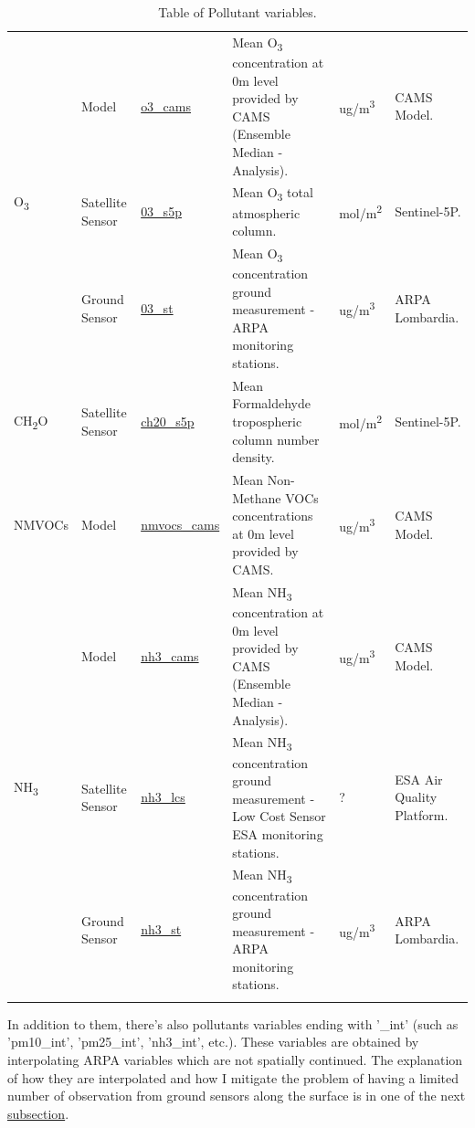 \begin{center}
\begin{longtable}{ |p{2cm}|p{1.5cm}|p{2.3cm}|p{4cm}|p{1cm}|p{2cm}| }
\multirow{3}{4em}{O\textsubscript{3}} & Model  & \underline{o3\_cams} & Mean O\textsubscript{3} concentration at 0m level provided by CAMS  (Ensemble Median - Analysis).\par & ug/m\textsuperscript{3} & CAMS Model.\\ 
& Satellite \newline Sensor  & \underline{03\_s5p} &  Mean O\textsubscript{3} total atmospheric column.\par  & mol/m\textsuperscript{2} & Sentinel-5P.\\ 
& Ground \newline Sensor & \underline{03\_st} &  Mean O\textsubscript{3} concentration ground measurement - ARPA monitoring stations.  \par& ug/m\textsuperscript{3} & ARPA \newline Lombardia.\\ 
 \hline
 
 \multirow{1}{4em}{CH\textsubscript{2}O}& Satellite \newline Sensor  & \underline{ch20\_s5p} &  Mean Formaldehyde tropospheric column number density. \par & mol/m\textsuperscript{2} & Sentinel-5P.\\ \hline
 
\multirow{1}{4em}{NMVOCs}& Model  & \underline{nmvocs\_cams} & Mean Non-Methane VOCs concentrations at 0m level provided by CAMS.\par & ug/m\textsuperscript{3} & CAMS Model.\\ \hline

\multirow{3}{4em}{NH\textsubscript{3}} & Model  & \underline{nh3\_cams} & Mean NH\textsubscript{3} concentration at 0m level provided by CAMS  (Ensemble Median - Analysis).\par & ug/m\textsuperscript{3} & CAMS Model.\\ 
& Satellite \newline Sensor  & \underline{nh3\_lcs} &  Mean NH\textsubscript{3} concentration ground measurement - Low Cost Sensor ESA monitoring stations. \par  & ? & ESA Air Quality Platform.\\ 
& Ground \newline Sensor & \underline{nh3\_st} &  Mean NH\textsubscript{3} concentration ground measurement - ARPA monitoring stations. \par & ug/m\textsuperscript{3} & ARPA \newline Lombardia.\\ \hline
\caption{Table of Pollutant variables.}
\end{longtable}
\end{center}
In addition to them, there's also pollutants variables ending with '\_int' (such as 'pm10\_int', 'pm25\_int', 'nh3\_int', etc.). These variables are obtained by interpolating ARPA variables which are not spatially continued. The explanation of how they are interpolated and how I mitigate the problem of having a limited number of observation from ground sensors along the surface is in one of the next \hyperref[subsec:nan]{subsection}.
